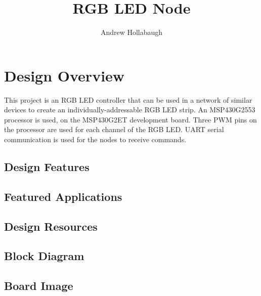 \documentclass{hitec}
\title{RGB LED Node}
\author{Andrew Hollabaugh}
\begin{document}
\maketitle
\section{Design Overview}

This project is an RGB LED controller that can be used in a network of similar devices to create an individually-addressable RGB LED strip. An MSP430G2553 processor is used, on the MSP430G2ET development board. Three PWM pins on the processor are used for each channel of the RGB LED. UART serial communication is used for the nodes to receive commands.

\subsection{Design Features}




\subsection{Featured Applications}




\subsection{Design Resources}





\subsection{Block Diagram}





\subsection{Board Image}
\end{document}

